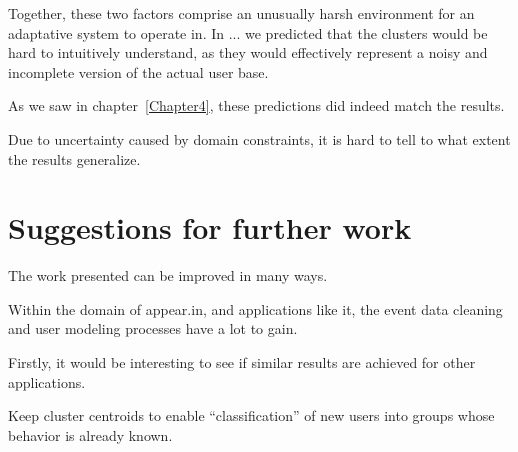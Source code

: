 Together, these two factors comprise an unusually harsh environment for an adaptative system to operate in. In ... we predicted that the clusters would be hard to intuitively understand, as they would effectively represent a noisy and incomplete version of the actual user base.

As we saw in chapter~\ref{Chapter4}, these predictions did indeed match the results.

Due to uncertainty caused by domain constraints, it is hard to tell to what extent the results generalize.


\section{Suggestions for further work} %
\label{conclusion:sec:further_work}

The work presented can be improved in many ways.

Within the domain of appear.in, and applications like it, the event data cleaning and user modeling processes have a lot to gain.

Firstly, it would be interesting to see if similar results are achieved for other applications.

Keep cluster centroids to enable ``classification'' of new users into groups whose behavior is already known.
